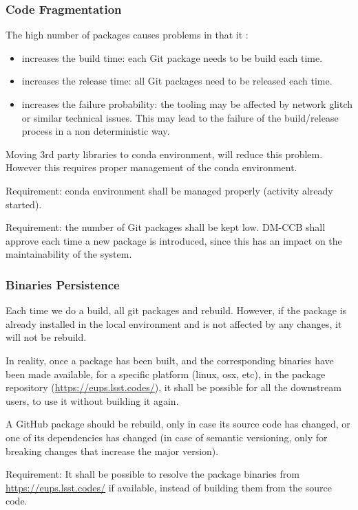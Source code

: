 \subsubsection{Code Fragmentation} \label{sec:problemCode}

The high number of packages causes problems in that it :

\begin{itemize}
\item increases the build time: each Git package needs to be build each time.
\item increases the release time: all Git packages need to be released each time.
\item increases the failure probability: the tooling may be affected by network glitch or similar technical issues. This may lead to the failure of the build/release process in a non deterministic way.
\end{itemize}

Moving 3rd party libraries to conda environment, will reduce this problem. 
However this requires proper management of the conda environment.

Requirement: conda environment shall be managed properly (activity already started).

Requirement: the number of Git packages shall be kept low. DM-CCB shall approve each time a new package is introduced, since this has an impact on the maintainability of the system.


\subsubsection{Binaries Persistence} \label{sec:problemPersistence}

Each time we do a build, all git packages and rebuild. However, if the package is already installed in the local environment and is not affected by any changes, it will not be rebuild.

In reality, once a package has been built, and the corresponding binaries have been made available, for a specific platform (linux, osx, etc), in the package repository (\url{https://eups.lsst.codes/}),
it shall be possible for all the downstream users, to use it without building it again.

A GitHub package should be rebuild, only in case its source code has changed, or one of its dependencies has changed (in case of semantic versioning, only for breaking changes that increase the major version).

Requirement: It shall be possible to resolve the package binaries from \url{https://eups.lsst.codes/} if available, instead of building them from the source code.


